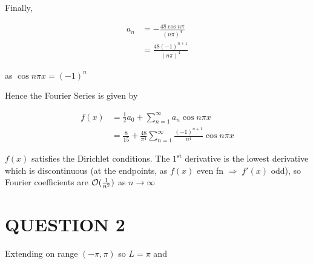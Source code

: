 \documentclass[a4paper]{article}
\begin{document}
Finally,

\begin{align*}
a_{n} & = - \frac{48 \cos n \pi }{(n \pi)^{4}} \\
& = \frac{48(-1)^{n+1}}{(n \pi)^{4}}
\end{align*}

as $ \cos n \pi x = (-1)^{n}$ 

Hence the Fourier Series is given by

\begin{align*}
f(x) & = \frac{1}{2}a_{0} + \sum_{n=1}^{\infty} a_{n} \cos n \pi x \\
& = \frac{8}{15} + \frac{48}{\pi^{4}}\sum_{n=1}^{\infty} \frac{(-1)^{n+1}}{n^{4}} \cos n \pi x
\end{align*}

\begin{center}
\end{center}


$ f(x) $ satisfies the Dirichlet conditions. The $ 1^{\text{st}} $ derivative is the lowest derivative which is discontinuous (at the endpoints, as $ f(x) $ even fn $ \Rightarrow \; f'(x) $ odd), so Fourier coefficients are $ \mathcal{O}(\frac{1}{n^{2}}) $ as $ n \to \infty $

\section{QUESTION 2}

Extending on range $ (-\pi,\pi) $ so $ L = \pi $ and
\end{document}
